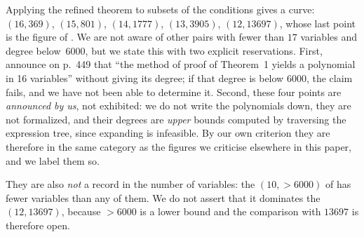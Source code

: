 Applying the refined theorem to subsets of the conditions gives a curve:
$(16,369)$, $(15,801)$, $(14,1777)$, $(13,3905)$, $(12,13697)$, whose last point
is the figure of \cite{jsww1976}. We are not aware of other pairs with fewer than $17$ variables and degree
below~$6000$, but we state this with two explicit reservations. First,
\cite{jsww1976} announce on p.~449 that ``the method of proof of Theorem~1
yields a polynomial in 16 variables'' without giving its degree; if that degree
is below $6000$, the claim fails, and we have not been able to determine it.
Second, these four points are \emph{announced by us}, not exhibited: we do not
write the polynomials down, they are not formalized, and their degrees are
\emph{upper} bounds computed by traversing the expression tree, since expanding
is infeasible. By our own criterion they are therefore in the same category as
the figures we criticise elsewhere in this paper, and we label them so.

They are also \emph{not} a record in the number of variables: the
$(10,>6000)$ of \cite{matiyasevich1981} has fewer variables than any of them.
We do not assert that it dominates the $(12,13697)$, because $>6000$ is a lower
bound and the comparison with $13697$ is therefore open.
